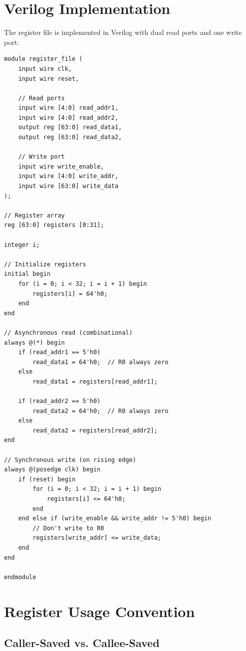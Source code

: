 \documentclass[12pt,a4paper,oneside]{book}
\begin{document}
\section{Verilog Implementation}

The register file is implemented in Verilog with dual read ports and one write port:

\begin{lstlisting}[style=verilog, caption={Register File Implementation}, label={lst:regfile}]
module register_file (
    input wire clk,
    input wire reset,
    
    // Read ports
    input wire [4:0] read_addr1,
    input wire [4:0] read_addr2,
    output reg [63:0] read_data1,
    output reg [63:0] read_data2,
    
    // Write port
    input wire write_enable,
    input wire [4:0] write_addr,
    input wire [63:0] write_data
);

// Register array
reg [63:0] registers [0:31];

integer i;

// Initialize registers
initial begin
    for (i = 0; i < 32; i = i + 1) begin
        registers[i] = 64'h0;
    end
end

// Asynchronous read (combinational)
always @(*) begin
    if (read_addr1 == 5'h0)
        read_data1 = 64'h0;  // R0 always zero
    else
        read_data1 = registers[read_addr1];
    
    if (read_addr2 == 5'h0)
        read_data2 = 64'h0;  // R0 always zero
    else
        read_data2 = registers[read_addr2];
end

// Synchronous write (on rising edge)
always @(posedge clk) begin
    if (reset) begin
        for (i = 0; i < 32; i = i + 1) begin
            registers[i] <= 64'h0;
        end
    end else if (write_enable && write_addr != 5'h0) begin
        // Don't write to R0
        registers[write_addr] <= write_data;
    end
end

endmodule
\end{lstlisting}

\section{Register Usage Convention}

\subsection{Caller-Saved vs. Callee-Saved}
\end{document}
